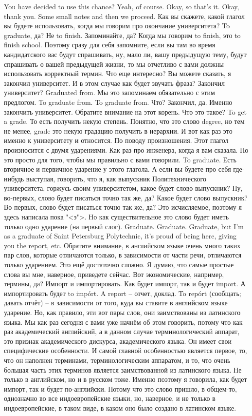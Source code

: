 \documentclass[main.tex]{subfiles}
\begin{document}
You have decided to use this chance? Yeah, of course.
Okay, so that's it.
Okay, thank you.
Some small notes and then we proceed.
Как вы скажете, какой глагол вы будете использовать, когда мы говорим про окончание университета?
To graduate, да?
Не to finish.
Запоминайте, да? Когда мы говорим to finish, это to finish school.
Поэтому сразу для себя запомните, если вы там во время кандидатского вас будут спрашивать, ну, мало ли, вашу предыдущую тему, будут спрашивать о вашей предыдущей жизни, то мы отчетливо с вами должны использовать корректный термин.
Что еще интересно? Вы можете сказать, я закончил университет.
И в этом случае как будет звучать фраза? Закончил университет?
Graduated from.
Мы это запоминаем обязательно с этим предлогом.
To graduate from.
To graduate from.
Что? Закончил, да.
Именно закончить университет.
Обратите внимание на этот корень.
Что это такое? To get a grade.
То есть получить некую степень.
Понятно, что это слово degree, но тем не менее, grade это некую градацию получить в иерархии.
И вот как раз это именно к университету и относится.
По поводу произношения.
Этот глагол произносится с двумя ударениями.
Как раз про инженера, когда я вам сказала.
Но это просто для того, чтобы мы правильно с вами говорили.
To graduate.
Есть вторичное и первичное ударение у этого глагола.
А если вы будете про себя где-нибудь выступая, говорить, что я, как выпускник Политехнического университета, горжусь своим университетом, какое будет слово выпускник?
Ну, во-первых, слово будет писаться точно так же, да?
Какое будет слово выпускник?
Во-первых, слово будет писаться точно так же, да?
Это исчисляемое, поэтому я здесь написала пока "<э">.
Но как существительное это слово будет иметь только одно ударение (на первый слог).
Graduate.
Graduate.
Graduate, but I'm as a graduate of Saint Petersburg Polytechnic, it's proud of being here, giving you the report, etc.
Обратите внимание, в английском языке очень много таких пар слов, которые отличаются только, в зависимости от части речи, отличаются только ударением.
Это ещё достаточно сложно.
Я думаю, что самые простые слова вы мне, наверное, приведете сейчас.
Вот экономические, например, термины, да? Импорт и импортировать.
Как будет импорт, так и будет import.
А импортировать будет to imp\'ort.
A report -- отчет, доклад.
To rep\'ort (сообщать; давать отчёт) -- в зависимости от того, куда вы ставите в английском языке ударение.
Но, как правило, эти вот пары слов, они заимствованы из латинского языка.
Мы как раз сегодня с вами уже начнём об этом говорить, потому что как раз академический английский, а в данном случае терминологический аппарат, это признак академического дискурса, академического языка.
Он имеет свои специфические особенности.
И самой главной особенностью является первое, то, что он наполнен терминами, терминологическим аппаратом, и то, что очень большая часть этих терминов является заимствованной из латинского языка.
Не только в английском, но и в русском тоже.
Именно поэтому я говорила, как будет импорт, так и будет по-английски.
Потому что это слово пришло, в общем-то, однозначно во все индоевропейские языки, но, наверное, и не только в индоевропейские, в таком виде, в каком оно было создано в латинском языке.
\end{document}
